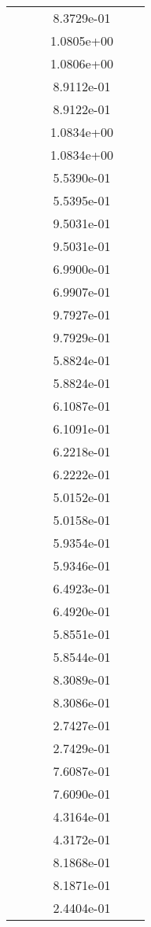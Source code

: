 \begin{xltabular}{\textwidth}{r|rS[table-format=1.3e+2]S[table-format=1.4e+2]S[table-format=1.4e+2]S[table-format=-1.5]}
&  &  & 8.3729e-01 & & \\
&  &  & 1.0805e+00 & & \\
&  &  & 1.0806e+00 & & \\
&  &  & 8.9112e-01 & & \\
&  &  & 8.9122e-01 & & \\
&  &  & 1.0834e+00 & & \\
&  &  & 1.0834e+00 & & \\
&  &  & 5.5390e-01 & & \\
&  &  & 5.5395e-01 & & \\
&  &  & 9.5031e-01 & & \\
&  &  & 9.5031e-01 & & \\
&  &  & 6.9900e-01 & & \\
&  &  & 6.9907e-01 & & \\
&  &  & 9.7927e-01 & & \\
&  &  & 9.7929e-01 & & \\
&  &  & 5.8824e-01 & & \\
&  &  & 5.8824e-01 & & \\
&  &  & 6.1087e-01 & & \\
&  &  & 6.1091e-01 & & \\
&  &  & 6.2218e-01 & & \\
&  &  & 6.2222e-01 & & \\
&  &  & 5.0152e-01 & & \\
&  &  & 5.0158e-01 & & \\
&  &  & 5.9354e-01 & & \\
&  &  & 5.9346e-01 & & \\
&  &  & 6.4923e-01 & & \\
&  &  & 6.4920e-01 & & \\
&  &  & 5.8551e-01 & & \\
&  &  & 5.8544e-01 & & \\
&  &  & 8.3089e-01 & & \\
&  &  & 8.3086e-01 & & \\
&  &  & 2.7427e-01 & & \\
&  &  & 2.7429e-01 & & \\
&  &  & 7.6087e-01 & & \\
&  &  & 7.6090e-01 & & \\
&  &  & 4.3164e-01 & & \\
&  &  & 4.3172e-01 & & \\
&  &  & 8.1868e-01 & & \\
&  &  & 8.1871e-01 & & \\
&  &  & 2.4404e-01 & & \\

\end{xltabular}

